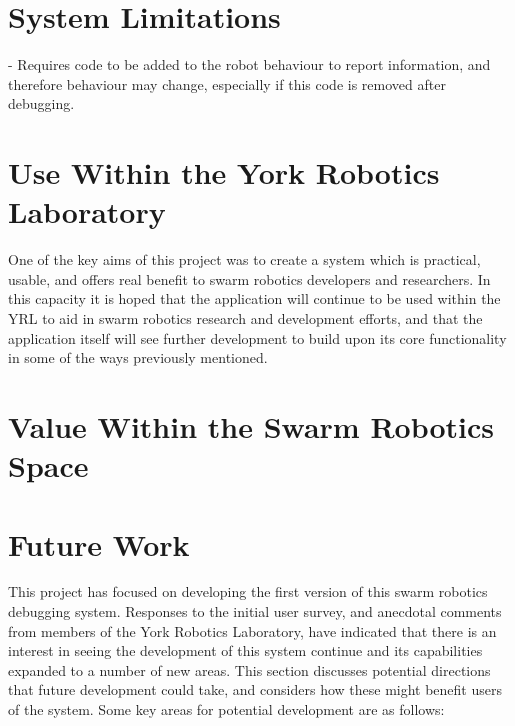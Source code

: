 
\section{System Limitations}

- Requires code to be added to the robot behaviour to report information, and therefore behaviour may change, especially if this code is removed after debugging.



\section{Use Within the York Robotics Laboratory}

One of the key aims of this project was to create a system which is practical, usable, and offers real benefit to swarm robotics developers and researchers. In this capacity it is hoped that the application will continue to be used within the YRL to aid in swarm robotics research and development efforts, and that the application itself will see further development to build upon its core functionality in some of the ways previously mentioned.


\section{Value Within the Swarm Robotics Space}



\section{Future Work} \label{FutureWork}

This project has focused on developing the first version of this swarm robotics debugging system. Responses to the initial user survey, and anecdotal comments from members of the York Robotics Laboratory, have indicated that there is an interest in seeing the development of this system continue and its capabilities expanded to a number of new areas. This section discusses potential directions that future development could take, and considers how these might benefit users of the system. Some key areas for potential development are as follows:

